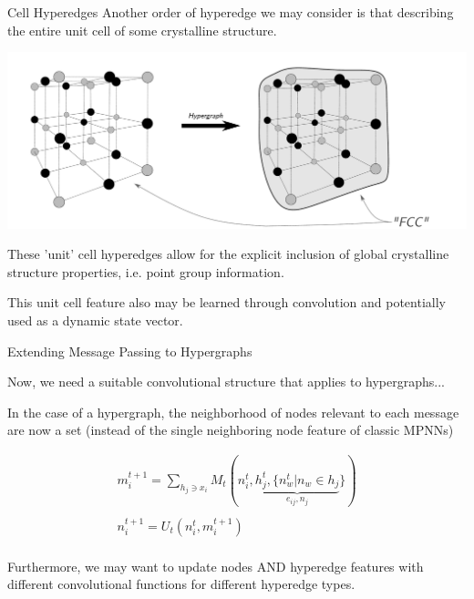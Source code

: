 \documentclass[11pt]{beamer}
\begin{document}
\begin{frame}{Cell Hyperedges}
\small
Another order of hyperedge we may consider is that describing the entire unit cell of some crystalline structure. \pause
\begin{center}
\includegraphics[scale=0.27]{cell_level_ex.pdf}
\end{center}\pause
These 'unit' cell hyperedges allow for the explicit inclusion of global crystalline structure properties, i.e. point group information.

\medskip\pause

This unit cell feature also may be learned through convolution and potentially used as a dynamic state vector.
\end{frame}



\begin{frame}{Extending Message Passing to Hypergraphs}

Now, we need a suitable convolutional structure that applies to hypergraphs...\pause

\medskip

In the case of a hypergraph, the neighborhood of nodes relevant to each message are now a set (instead of the single neighboring node feature of classic MPNNs)\pause

\begin{gather*}
m_i^{t+1}=\sum_{h_j\ni x_i} M_t(n_i^{t},\underbrace{h_j^{t},\lbrace  n_w^t \vert n_w \in h_j }_{e_{ij},n_j}\rbrace)\\
\\
n_i^{t+1}=U_t(n_i^t,m_i^{t+1})\\
\end{gather*}

\pause
Furthermore, we may want to update nodes AND hyperedge features with different convolutional functions for different hyperedge types.
\end{frame}
\end{document}

